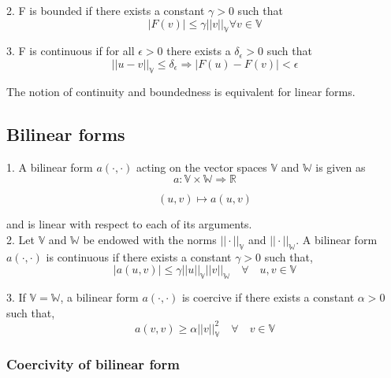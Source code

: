 \documentclass[a4paper]{book}
\begin{document}
\begin{appendices}
2. F is bounded if there exists a constant $\gamma > 0$ such that
\begin{equation} 
|F(v)| \leq \gamma ||v||_\mathbb{V} \forall v \in \mathbb{V}
\end{equation}

3. F is continuous if for all $\epsilon > 0$ there exists a $\delta_\epsilon > 0$ such that \\
\begin{equation}
||u - v||_\mathbb{V} \leq \delta_\epsilon \Rightarrow  |F(u) - F(v)| < \epsilon
\end{equation}

The notion of continuity and boundedness is equivalent for linear forms.

\subsection{Bilinear forms}

1. A bilinear form $a(\cdot,\cdot)$ acting on the vector spaces $\mathbb{V}$ and $\mathbb{W}$ is given as
\begin{equation}
a : \mathbb{V} \times \mathbb{W} \Rightarrow \mathbb{R}
\end{equation}

\begin{equation}
(u,v) \mapsto a(u,v)
\end{equation}

and is linear with respect to each of its arguments.\\

2. Let $\mathbb{V}$ and $\mathbb{W}$ be endowed with the norms $||\cdot||_\mathbb{V}$ and $||\cdot||_\mathbb{W}$. A bilinear form $a(\cdot,\cdot)$ is continuous if there exists a constant $\gamma > 0$ such that,
\begin{equation}
|a(u,v)| \leq \gamma ||u||_\mathbb{V} ||v||_\mathbb{W} \quad \forall \quad u,v \in \mathbb{V}
\end{equation}

3. If $\mathbb{V} = \mathbb{W}$, a bilinear form $a(\cdot,\cdot)$ is coercive if there exists a constant $\alpha > 0$ such that,
\begin{equation}
a(v,v) \geq \alpha ||v||_\mathbb{V}^2  \quad \forall \quad v \in  \mathbb{V}
\end{equation}

\subsubsection{Coercivity of bilinear form} \label{Coercivity_constant}


\end{appendices}
\end{document}
